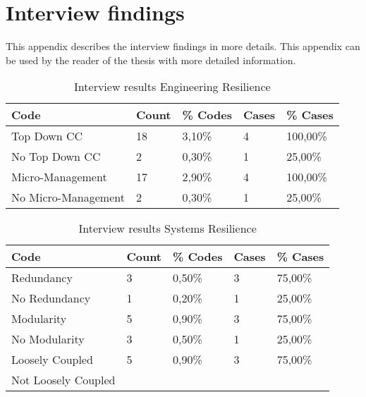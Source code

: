 \appendix
\chapter{Interview findings}
\label{app:interviewfindings}
This appendix describes the interview findings in more details. This appendix can be used by the reader of the thesis with more detailed information.
\begin{table}[htbp]
	\centering
	\begin{tabular}{lllll}
		\toprule
		\textbf{Code} & \multicolumn{1}{l}{\textbf{Count}} & \multicolumn{1}{l}{\textbf{\% Codes}} & \multicolumn{1}{l}{\textbf{Cases}} & \multicolumn{1}{l}{\textbf{\% Cases}} \\
		\midrule
		Top Down CC &  18    & 3,10\% & 4     & 100,00\% \\
		No Top Down CC & 2     & 0,30\% & 1     & 25,00\% \\
		Micro-Management & 17    & 2,90\% & 4     & 100,00\% \\
		No Micro-Management & 2     & 0,30\% & 1     & 25,00\% \\
		\bottomrule
	\end{tabular}%
	\caption{Interview results Engineering Resilience}
	\label{tab:interviewresultsengineeringresilience}%
\end{table}%

\begin{table}[htbp]
	\centering
	\begin{tabular}{lllll}
		\toprule
		\textbf{Code} & \textbf{Count} & \textbf{\% Codes} &\textbf{Cases} & \textbf{\% Cases} \\
		\midrule
		Redundancy & 3     & 0,50\% & 3     & 75,00\% \\
		No Redundancy & 1     & 0,20\% & 1     & 25,00\% \\
		Modularity & 5     & 0,90\% & 3     & 75,00\% \\
		No Modularity & 3     & 0,50\% & 1     & 25,00\% \\
		Loosely Coupled & 5     & 0,90\% & 3     & 75,00\% \\
		Not Loosely Coupled &       &       &       &  \\
		\bottomrule
	\end{tabular}%
		\caption{Interview results Systems Resilience}%
	\label{tab:interviewresults Systems Resilience}%
\end{table}%

